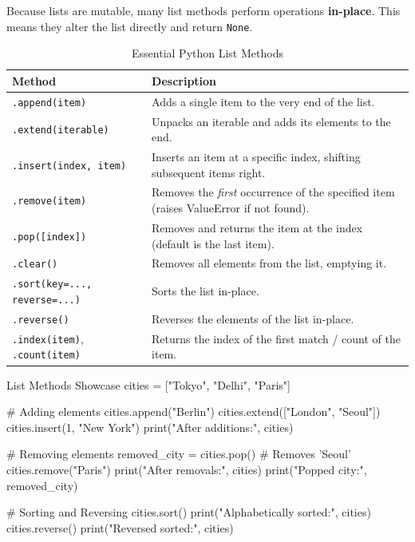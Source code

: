 Because lists are mutable, many list methods perform operations \textbf{in-place}. This means they alter the list directly and return \texttt{None}.

\begin{table}[H]
    \centering\sffamily
    
    \begin{tabular}{p{4.5cm} p{10cm}}
    \toprule
    \textbf{Method} & \textbf{Description} \\
    \midrule
    \texttt{.append(item)} & Adds a single item to the very end of the list. \\
    \texttt{.extend(iterable)} & Unpacks an iterable and adds its elements to the end. \\
    \texttt{.insert(index, item)} & Inserts an item at a specific index, shifting subsequent items right. \\
    \texttt{.remove(item)} & Removes the \textit{first} occurrence of the specified item (raises ValueError if not found). \\
    \texttt{.pop([index])} & Removes and returns the item at the index (default is the last item). \\
    \texttt{.clear()} & Removes all elements from the list, emptying it. \\
    \texttt{.sort(key=..., reverse=...)} & Sorts the list in-place. \\
    \texttt{.reverse()} & Reverses the elements of the list in-place. \\
    \texttt{.index(item)}, \texttt{.count(item)} & Returns the index of the first match / count of the item. \\
    \bottomrule
    \end{tabular}
    \caption{Essential Python List Methods}
\end{table}

\begin{pythoncode}[]{List Methods Showcase}
cities = ["Tokyo", "Delhi", "Paris"]

# Adding elements
cities.append("Berlin")
cities.extend(["London", "Seoul"])
cities.insert(1, "New York")
print("After additions:", cities)

# Removing elements
removed_city = cities.pop() # Removes 'Seoul'
cities.remove("Paris")
print("After removals:", cities)
print("Popped city:", removed_city)

# Sorting and Reversing
cities.sort()
print("Alphabetically sorted:", cities)
cities.reverse()
print("Reversed sorted:", cities)
\end{pythoncode}

